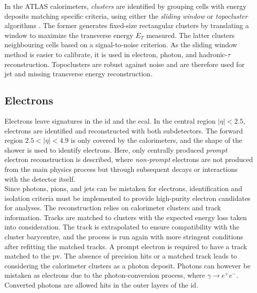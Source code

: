 In the ATLAS calorimeters, \textit{clusters} are identified by grouping cells with energy deposits matching specific criteria, using either the \textit{sliding window} or \textit{topocluster} algorithms \cite{Lampl:1099735}. The former generates fixed-size rectangular clusters by translating a window to maximize the transverse energy $E_T$ measured. The latter clusters neighbouring cells based on a signal-to-noise criterion. As the sliding window method is easier to calibrate, it is used in electron, photon, and hadronic-$\tau$ reconstruction. Topoclusters are robust against noise and are therefore used for jet and missing transverse energy reconstruction.

\subsection{Electrons}\label{sec-atlas-el}
Electrons leave signatures in the \gls{id} and the \gls{ecal}. In the central region $|\eta| < 2.5$, electrons are identified and reconstructed with both subdetectors. The forward region $2.5 < |\eta| < 4.9$ is only covered by the calorimeters, and the shape of the shower is used to identify electrons. Here, only centrally produced \textit{prompt} electron reconstruction is described, where \textit{non-prompt} electrons are not produced from the main physics process but through subsequent decays or interactions with the detector itself. \\

Since photons, pions, and jets can be mistaken for electrons, identification and isolation criteria must be implemented to provide high-purity electron candidates for analyses. The reconstruction relies on calorimeter clusters and track information. Tracks are matched to clusters with the expected energy loss taken into consideration. The track is extrapolated to ensure compatibility with the cluster barycentre, and the process is run again with more stringent conditions after refitting the matched tracks. A prompt electron is required to have a track matched to the \gls{pv}. The absence of precision hits or a matched track leads to considering the calorimeter clusters as a photon deposit. Photons can however be mistaken as electrons due to the photon-conversion process, where $\gamma \rightarrow e^+e^-$. Converted photons are allowed hits in the outer layers of the \gls{id}. \\

